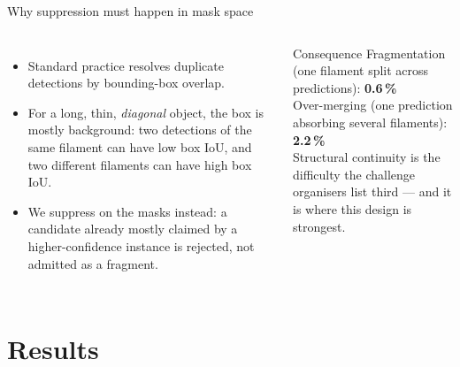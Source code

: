 \documentclass[aspectratio=169,xcolor=dvipsnames]{beamer}
\begin{document}
\begin{frame}{Why suppression must happen in mask space}
  \begin{columns}
      \begin{itemize}
        \item Standard practice resolves duplicate detections by bounding-box overlap.
        \item For a long, thin, \emph{diagonal} object, the box is mostly background: two detections of the same filament can have low box IoU, and two different filaments can have high box IoU.
        \item We suppress on the masks instead: a candidate already mostly claimed by a higher-confidence instance is rejected, not admitted as a fragment.
      \end{itemize}
      \begin{exampleblock}{Consequence}
        \small
        Fragmentation (one filament split across predictions): \textbf{0.6\,\%}\\[2pt]
        Over-merging (one prediction absorbing several filaments): \textbf{2.2\,\%}\\[6pt]
        Structural continuity is the difficulty the challenge organisers list third --- and it is where this design is strongest.
      \end{exampleblock}
  \end{columns}
\end{frame}

\section{Results}
\end{document}
